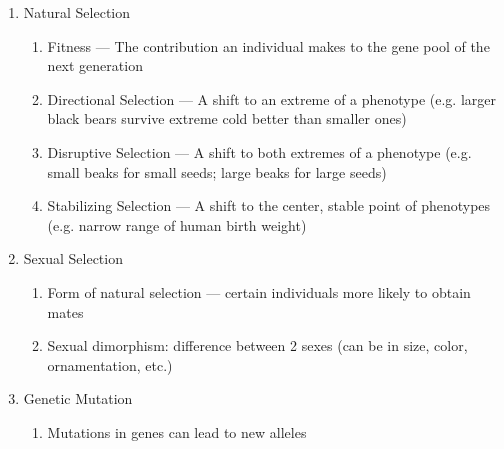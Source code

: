 \documentclass[12pt]{article}
\begin{document}
\begin{itemize}
\begin{enumerate}
\begin{enumerate}
        \end{enumerate}

      \item Natural Selection

        \begin{enumerate}

          \item Fitness — The contribution an individual makes to the gene pool of the next generation

          \item Directional Selection — A shift to an extreme of a phenotype (e.g. larger black bears survive extreme cold better than smaller ones)

          \item Disruptive Selection — A shift to both extremes  of a phenotype (e.g. small beaks for small seeds; large beaks for large seeds)

          \item Stabilizing Selection — A shift to the center, stable point of phenotypes (e.g. narrow range of human birth weight)

        \end{enumerate}

      \item Sexual Selection

        \begin{enumerate}

          \item Form of natural selection — certain individuals more likely to obtain mates

          \item Sexual dimorphism: difference between 2 sexes (can be in size, color, ornamentation, etc.)

        \end{enumerate}

      \item Genetic Mutation

        \begin{enumerate}

          \item Mutations in genes can lead to new alleles

        \end{enumerate}

    \end{enumerate}

\end{itemize}
\end{document}
